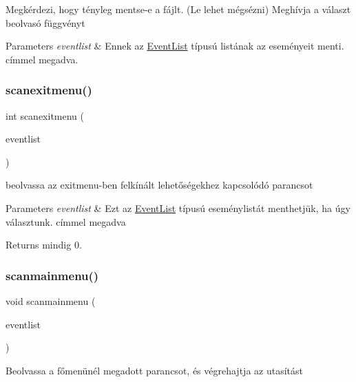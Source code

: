 Megkérdezi, hogy tényleg mentse-\/e a fájlt. (Le lehet mégsézni) Meghívja a választ beolvasó függvényt 
\begin{DoxyParams}{Parameters}
{\em eventlist} & Ennek az \hyperlink{struct_event_list}{Event\+List} típusú listának az eseményeit menti. címmel megadva. \\
\hline
\end{DoxyParams}
\mbox{\label{group__menu_gaa12eba16d2e2bd5dfc70240d19bd5c8e}} 
\subsubsection{\texorpdfstring{scanexitmenu()}{scanexitmenu()}}
{\footnotesize\ttfamily int scanexitmenu (\begin{DoxyParamCaption}\item[{\hyperlink{struct_event_list}{Event\+List} $\ast$}]{eventlist }\end{DoxyParamCaption})}

beolvassa az exitmenu-\/ben felkínált lehetőségekhez kapcsolódó parancsot 
\begin{DoxyParams}{Parameters}
{\em eventlist} & Ezt az \hyperlink{struct_event_list}{Event\+List} típusú eseménylistát menthetjük, ha úgy választunk. címmel megadva \\
\hline
\end{DoxyParams}
\begin{DoxyReturn}{Returns}
mindig 0. 
\end{DoxyReturn}
\mbox{\label{group__menu_ga8e572ab27981dcd7144340fd25a24c80}} 
\subsubsection{\texorpdfstring{scanmainmenu()}{scanmainmenu()}}
{\footnotesize\ttfamily void scanmainmenu (\begin{DoxyParamCaption}\item[{\hyperlink{struct_event_list}{Event\+List} $\ast$}]{eventlist }\end{DoxyParamCaption})}

Beolvassa a főmenünél megadott parancsot, és végrehajtja az utasítást \mbox{\label{group__menu_gadaafbda0a45084d074a4d210ec37efac}} 
